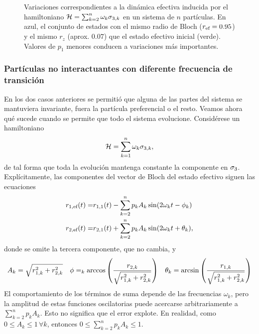 \begin{figure}[ht!]
\begin{subfigure}{0.5\textwidth}
    \end{subfigure}
    \caption{Variaciones correspondientes a la dinámica efectiva inducida por el hamiltoniano $\mathcal{H}=\sum_{k=2}^{n}\omega_{k}\sigma_{3,k}$ en un sistema de $n$ partículas. En azul, el conjunto de estados con el mismo radio de Bloch ($r_{\text{ef}}=0.95$) y el mismo $r_{z}$ (aprox. $0.07$) que el estado efectivo inicial (verde). Valores de $p_{1}$ menores conducen a variaciones más importantes. \label{fig:PrefInv2}}
\end{figure}

\subsubsection{Partículas no interactuantes con diferente frecuencia de transición}

En los dos casos anteriores se permitió que alguna de las partes del sistema se mantuviera invariante, fuera la partícula preferencial o el resto. Veamos ahora qué sucede cuando se permite que todo el sistema evolucione. Considérese un hamiltoniano
\begin{equation}
    \mathcal{H}=\sum_{k=1}^{n}\omega_{k}\sigma_{3,k},\nonumber
\end{equation}
de tal forma que toda la evolución mantenga constante la componente en $\sigma_{3}$. Explícitamente, las componentes del vector de Bloch del estado efectivo siguen las ecuaciones
\begin{align}
    r_{1,\text{ef}}(t)=&r_{1,1}(t)-\sum_{k=2}^{n}p_{k}A_{k}\sin(2\omega_{k} t-\phi_{k})\nonumber\\
    r_{2,\text{ef}}(t)=&r_{2,1}(t)+\sum_{k=2}^{n}p_{k}A_{k}\sin(2\omega_{k} t+\theta_{k}),\nonumber
\end{align}
donde se omite la tercera componente, que no cambia, y
\begin{align}
    A_{k}=\sqrt{r_{1,k}^{2}+r_{2,k}^{2}} & & \phi=_{k}\arccos\qty(\frac{r_{2,k}}{\sqrt{r_{1,k}^{2}+r_{2,k}^{2}}}) & & \theta_{k}=\arcsin\qty(\frac{r_{1,k}}{\sqrt{r_{1,k}^{2}+r_{2,k}^{2}}})\nonumber
\end{align}
El comportamiento de los términos de suma depende de las frecuencias $\omega_{k}$, pero la amplitud de estas funciones oscilatorias puede acercarse arbitrariamente a $\sum_{k=2}^{n} p_{k} A_{k}$. Esto no significa que el error explote. En realidad, como $0\leq A_{k}\leq 1\,\forall k$, entonces $0\leq\sum_{k=2}^{n} p_{k} A_{k}\leq 1$. 


